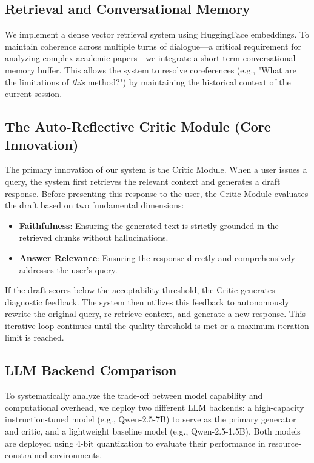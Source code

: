 \documentclass[11pt,a4paper]{article}
\begin{document}
\subsection{Retrieval and Conversational Memory}
We implement a dense vector retrieval system using HuggingFace embeddings. To maintain coherence across multiple turns of dialogue—a critical requirement for analyzing complex academic papers—we integrate a short-term conversational memory buffer. This allows the system to resolve coreferences (e.g., "What are the limitations of \textit{this} method?") by maintaining the historical context of the current session.

\subsection{The Auto-Reflective Critic Module (Core Innovation)}
The primary innovation of our system is the Critic Module. When a user issues a query, the system first retrieves the relevant context and generates a draft response. Before presenting this response to the user, the Critic Module evaluates the draft based on two fundamental dimensions:
\begin{itemize}
    \item \textbf{Faithfulness}: Ensuring the generated text is strictly grounded in the retrieved chunks without hallucinations.
    \item \textbf{Answer Relevance}: Ensuring the response directly and comprehensively addresses the user's query.
\end{itemize}
If the draft scores below the acceptability threshold, the Critic generates diagnostic feedback. The system then utilizes this feedback to autonomously rewrite the original query, re-retrieve context, and generate a new response. This iterative loop continues until the quality threshold is met or a maximum iteration limit is reached.

\subsection{LLM Backend Comparison}
To systematically analyze the trade-off between model capability and computational overhead, we deploy two different LLM backends: a high-capacity instruction-tuned model (e.g., Qwen-2.5-7B) to serve as the primary generator and critic, and a lightweight baseline model (e.g., Qwen-2.5-1.5B). Both models are deployed using 4-bit quantization to evaluate their performance in resource-constrained environments.
\end{document}
